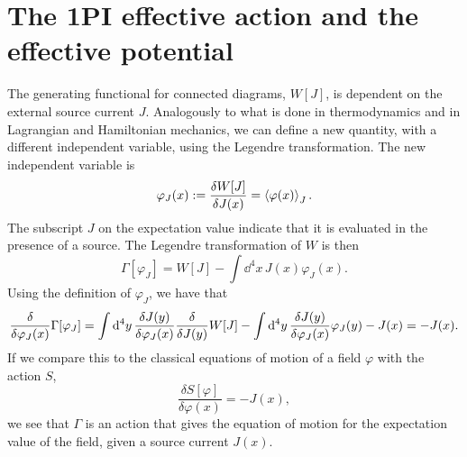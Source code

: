 \section{The 1PI effective action and the effective potential}

\label{section: effective action}
The generating functional for connected diagrams, $W[J]$, is dependent on the external source current $J$.
Analogously to what is done in thermodynamics and in Lagrangian and Hamiltonian mechanics, we can define a new quantity, with a different independent variable, using the Legendre transformation.
The new independent variable is 
\begin{equation}
    \varphi_J(x) := \frac{\delta W[J]}{\delta J(x)} = \ex{\varphi(x)}_J.
\end{equation}
The subscript $J$ on the expectation value indicate that it is evaluated in the presence of a source.
The Legendre transformation of $W$ is then
\begin{equation}
    \label{1PI effective action}
    \Gamma[\varphi_J]
    = W[J] - \int \dd^4 x \, J(x) \varphi_J(x).
\end{equation}
Using the definition of $\varphi_J$, we have that
\begin{equation}
    \label{effective equation of motion}
    \fdv{\varphi_J(x)} \Gamma[\varphi_J]
    = \int \dd^4 y \, \fdv{J(y)}{\varphi_J(x)} \fdv{J(y)} W[J]
    - \int \dd^4 y \, \fdv{J(y)}{\varphi_J(x)} \varphi_J(y)
    - J(x)
    = - J(x).
\end{equation}
If we compare this to the classical equations of motion of a field $\varphi$ with the action $S$,
\begin{equation}
    \frac{\delta S[\varphi]}{\delta \varphi(x)} = -J(x),
\end{equation}
we see that $\Gamma$ is an action that gives the equation of motion for the expectation value of the field, given a source current $J(x)$.

